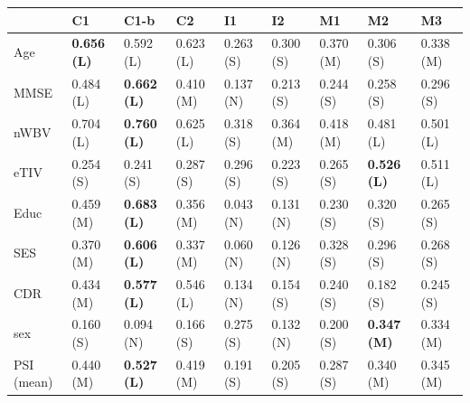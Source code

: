 \begin{tabular}{lllllllll}
\toprule
 & C1 & C1-b & C2 & I1 & I2 & M1 & M2 & M3 \\
\midrule
Age & \textbf{0.656 (L)} & 0.592 (L) & 0.623 (L) & 0.263 (S) & 0.300 (S) & 0.370 (M) & 0.306 (S) & 0.338 (M) \\
MMSE & 0.484 (L) & \textbf{0.662 (L)} & 0.410 (M) & 0.137 (N) & 0.213 (S) & 0.244 (S) & 0.258 (S) & 0.296 (S) \\
nWBV & 0.704 (L) & \textbf{0.760 (L)} & 0.625 (L) & 0.318 (S) & 0.364 (M) & 0.418 (M) & 0.481 (L) & 0.501 (L) \\
eTIV & 0.254 (S) & 0.241 (S) & 0.287 (S) & 0.296 (S) & 0.223 (S) & 0.265 (S) & \textbf{0.526 (L)} & 0.511 (L) \\
Educ & 0.459 (M) & \textbf{0.683 (L)} & 0.356 (M) & 0.043 (N) & 0.131 (N) & 0.230 (S) & 0.320 (S) & 0.265 (S) \\
SES & 0.370 (M) & \textbf{0.606 (L)} & 0.337 (M) & 0.060 (N) & 0.126 (N) & 0.328 (S) & 0.296 (S) & 0.268 (S) \\
CDR & 0.434 (M) & \textbf{0.577 (L)} & 0.546 (L) & 0.134 (N) & 0.154 (S) & 0.240 (S) & 0.182 (S) & 0.245 (S) \\
sex & 0.160 (S) & 0.094 (N) & 0.166 (S) & 0.275 (S) & 0.132 (N) & 0.200 (S) & \textbf{0.347 (M)} & 0.334 (M) \\
PSI (mean) & 0.440 (M) & \textbf{0.527 (L)} & 0.419 (M) & 0.191 (S) & 0.205 (S) & 0.287 (S) & 0.340 (M) & 0.345 (M) \\
\bottomrule
\end{tabular}
